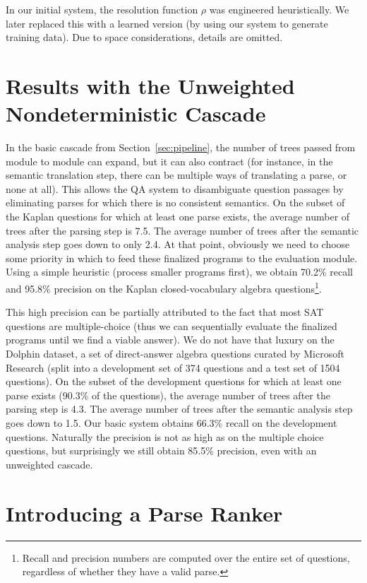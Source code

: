 \documentclass[11pt,letterpaper]{article}
\begin{document}
\noindent In our initial system, the resolution function $\rho$ was engineered heuristically. We later replaced this with a learned version (by using our system to generate training data). Due to space considerations, details are omitted. 

\section{Results with the Unweighted Nondeterministic Cascade}

In the basic cascade from Section~\ref{sec:pipeline}, the number of trees passed from module to module can expand, but it can also contract (for instance, in the semantic translation step, there can be multiple ways of translating a parse, or none at all). This allows the QA system to disambiguate question passages by eliminating parses for which there is no consistent semantics. On the subset of the Kaplan questions for which at least one parse exists, the average number of trees after the parsing step is 7.5. The average number of trees after the semantic analysis step goes down to only 2.4. At that point, obviously we need to choose some priority in which to feed these finalized programs to the evaluation module. Using a simple heuristic (process smaller programs first), we obtain 70.2\% recall and 95.8\% precision on the Kaplan closed-vocabulary algebra questions\footnote{Recall and precision numbers are computed over the entire set of questions, regardless of whether they have a valid parse.}.

This high precision can be partially attributed to the fact that most SAT questions are multiple-choice (thus we can sequentially evaluate the finalized programs until we find a viable answer). We do not have that luxury on the Dolphin dataset, a set of direct-answer algebra questions curated by Microsoft Research (split into a development set of 374 questions and a test set of 1504 questions). On the subset of the development questions for which at least one parse exists (90.3\% of the questions), the average number of trees after the parsing step is 4.3. The average number of trees after the semantic analysis step goes down to 1.5. Our basic system obtains 66.3\% recall on the development questions. Naturally the precision is not as high as on the multiple choice questions, but surprisingly we still obtain 85.5\% precision, even with an unweighted cascade.

\section{Introducing a Parse Ranker\label{sec:ranking}}
\end{document}
